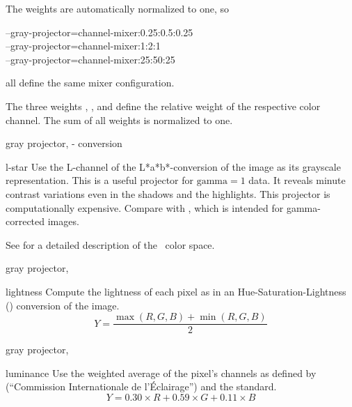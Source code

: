 \begin{codelist}
\begin{codelist}
    The weights are automatically normalized to one, so

    \begin{literal}
      --gray-projector=channel-mixer:0.25:0.5:0.25 \\
      --gray-projector=channel-mixer:1:2:1 \\
      --gray-projector=channel-mixer:25:50:25
    \end{literal}

    all define the same mixer configuration.

    The three weights , , and
     define the relative weight of the respective color channel.  The
    sum of all weights is normalized to one.

           {gray projector, }%
           {- conversion}%
  \item[l-star]\itemend
    Use the L-channel of the L*a*b*-conversion of the image as its grayscale representation.
    This is a useful projector for $\mbox{gamma} = 1$ data.  It reveals minute contrast
    variations even in the shadows and the highlights.  This projector is computationally
    expensive.  Compare with , which is intended for gamma-corrected images.

    See  for a detailed description of the
    ~color space.

           {gray projector, }%
  \item[lightness]\itemend
    Compute the lightness of each  pixel as in an
    Hue\hyp{}Saturation\hyp{}Lightness () conversion of the image.
    \[
    Y = \frac{\max(R, G, B) + \min(R, G, B)}{2}
    \]

           {gray projector, }%
  \item[luminance]\itemend
    Use the weighted average of the  pixel's channels as defined by 
    (``Commission Internationale de l'\'Eclairage'') and the  standard.
    \[
    Y = 0.30 \times R + 0.59 \times G + 0.11 \times B
    \]


\end{codelist}
\end{codelist}
